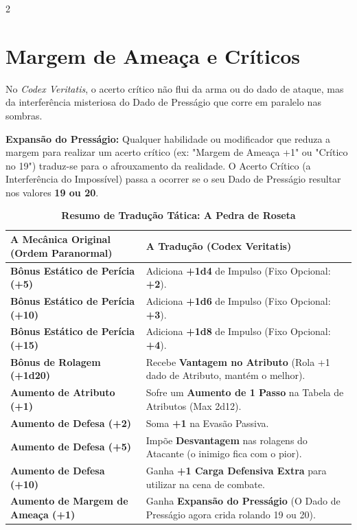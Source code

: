 \documentclass[a4paper,11pt,openany]{book}
\begin{document}
\begin{multicols}{2}
\section{Margem de Ameaça e Críticos}

No \textit{Codex Veritatis}, o acerto crítico não flui da arma ou do dado de ataque, mas da interferência misteriosa do Dado de Presságio que corre em paralelo nas sombras.

\begin{regra}
\textbf{Expansão do Presságio:} Qualquer habilidade ou modificador que reduza a margem para realizar um acerto crítico (ex: "Margem de Ameaça +1" ou "Crítico no 19") traduz-se para o afrouxamento da realidade. O Acerto Crítico (a Interferência do Impossível) passa a ocorrer se o seu Dado de Presságio resultar nos valores \textbf{19 ou 20}.
\end{regra}

\end{multicols}

\begin{table}[t]
\centering
\sffamily
\renewcommand{\arraystretch}{1.4}
\begin{tabularx}{\textwidth}{l X}
\toprule
\textbf{A Mecânica Original (Ordem Paranormal)} & \textbf{A Tradução (Codex Veritatis)} \\
\midrule
\textbf{Bônus Estático de Perícia (+5)} & Adiciona \textbf{+1d4} de Impulso (Fixo Opcional: \textbf{+2}). \\
\textbf{Bônus Estático de Perícia (+10)} & Adiciona \textbf{+1d6} de Impulso (Fixo Opcional: \textbf{+3}). \\
\textbf{Bônus Estático de Perícia (+15)} & Adiciona \textbf{+1d8} de Impulso (Fixo Opcional: \textbf{+4}). \\
\textbf{Bônus de Rolagem (+1d20)} & Recebe \textbf{Vantagem no Atributo} (Rola +1 dado de Atributo, mantém o melhor). \\
\textbf{Aumento de Atributo (+1)} & Sofre um \textbf{Aumento de 1 Passo} na Tabela de Atributos (Max 2d12). \\
\textbf{Aumento de Defesa (+2)} & Soma \textbf{+1} na Evasão Passiva. \\
\textbf{Aumento de Defesa (+5)} & Impõe \textbf{Desvantagem} nas rolagens do Atacante (o inimigo fica com o pior). \\
\textbf{Aumento de Defesa (+10)} & Ganha \textbf{+1 Carga Defensiva Extra} para utilizar na cena de combate. \\
\textbf{Aumento de Margem de Ameaça (+1)} & Ganha \textbf{Expansão do Presságio} (O Dado de Presságio agora crida rolando 19 ou 20). \\
\bottomrule
\end{tabularx}
\caption{\textbf{Resumo de Tradução Tática: A Pedra de Roseta}}
\end{table}
\end{document}
